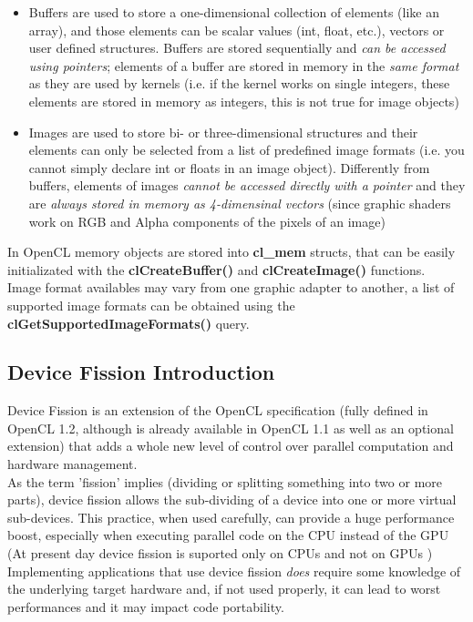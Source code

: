\begin{itemize}
	\item Buffers are used to store a one-dimensional collection of elements (like an array), and those elements can be scalar values (int, float, etc.), vectors or user defined structures.
	Buffers are stored sequentially and \emph{can be accessed using pointers}; elements of a buffer are stored in memory in the \emph{same format} as they are used by kernels (i.e. if the kernel works on single integers, these elements are stored in memory as integers, this is not true for image objects)
	\item Images are used to store bi- or three-dimensional structures and their elements can only be selected from a list of predefined image formats (i.e. you cannot simply declare int or floats in an image object). Differently from buffers, elements of images \emph{cannot be accessed directly with a pointer} and they are \emph{always stored in memory as 4-dimensinal vectors} (since graphic shaders work on RGB and Alpha components of the pixels of an image)
\end{itemize}

\begin{CLCode}
In OpenCL memory objects are stored into \textbf{cl\_mem} structs, that can be easily initializated with the \textbf{clCreateBuffer()} and \textbf{clCreateImage()} functions.\\
Image format availables may vary from one graphic adapter to another, a list of supported image formats can be obtained using the \textbf{clGetSupportedImageFormats()} query.
\end{CLCode}



\vfill
\columnbreak
\subsection{Device Fission Introduction}

Device Fission is an extension of the OpenCL specification (fully defined in OpenCL 1.2, although is already available in OpenCL 1.1 as well as an optional extension) that adds a whole new level of control over parallel computation and hardware management.\\
As the term 'fission' implies (dividing or splitting something into two or more parts), device fission allows the sub-dividing of a device into one or more virtual sub-devices. This practice, when used carefully, can provide a huge performance boost, especially when executing parallel code on the CPU instead of the GPU \cite{intel:12:DeviceFission} (At present day device fission is suported only on CPUs and not on GPUs \cite{gaster:11:DeviceFission})
Implementing applications that use device fission \emph{does} require some knowledge of the underlying target hardware and, if not used properly, it can lead to worst performances and it may impact code portability.

